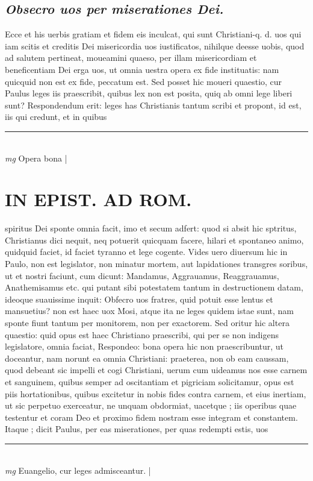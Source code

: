 \documentclass{article}
\begin{document}
\begin{pages}
\subsection*{\textit{Obsecro uos per miserationes Dei. }}\pstart Ecce et his uerbis gratiam et fidem eis inculcat, qui sunt Christiani-q. d. uos qui iam scitis et creditis Dei misericordia uos iustificatos, nihilque deesse uobis, quod ad salutem pertineat, moueamini quaeso, per illam misericordiam et beneficentiam Dei erga uos, ut omnia uestra opera ex fide instituatis: nam quicquid non est ex fide, peccatum est. Sed posset hic moueri quaestio, cur Paulus leges iis praescribit, quibus lex non est posita, quiq ab omni lege liberi sunt? Respondendum erit: leges has Christianis tantum scribi et propont, id est, iis qui credunt, et in quibus  \pend
\vspace{0.5cm}\noindent
\vspace{0.2cm}\rule{1cm}{0.2pt}\\ 
\hspace{0.2cm}\textit{mg}
\footnotesize Opera bona
\normalsize| 
\section*{IN EPIST. AD ROM.  }
\marginpar{[ p.139 ]}\pstart spiritus Dei sponte omnia facit, imo et secum adfert: quod si absit hic sptritus, Christianus dici nequit, neq potuerit quicquam facere, hilari et spontaneo animo, quidquid faciet, id faciet tyranno et lege cogente. Vides uero diuersum hic in Paulo, non est legislator, non minatur mortem, aut lapidationes transgres soribus, ut et nostri faciunt, cum dicunt: Mandamus, Aggrauamus, Reaggrauamus, Anathemisamus etc. qui putant sibi potestatem tantum in destructionem datam, ideoque suauissime inquit: Obfecro uos fratres, quid potuit esse lentus et mansuetius? non est haec uox Mosi, atque ita ne leges quidem istae sunt, nam sponte fiunt tantum per monitorem, non per exactorem. Sed oritur hic altera quaestio: quid opus est haec Christiano praescribi, qui per se non indigens legislatore, omnia faciat, Respondeo: bona opera hic non praescribuntur, ut doceantur, nam norunt ea omnia Christiani: praeterea, non ob eam caussam, quod debeant sic impelli et cogi Christiani, uerum cum uideamus nos esse carnem et sanguinem, quibus semper ad oscitantiam et pigriciam solicitamur, opus est piis hortationibus, quibus excitetur in nobis fides contra carnem, et eius inertiam, ut sic perpetuo exerceatur, ne unquam obdormiat, uacetque ; iis operibus quae testentur et coram Deo et proximo fidem nostram esse integram et constantem. Itaque ; dicit Paulus, per eas miserationes, per quas redempti estis, uos  \pend
\vspace{0.5cm}\noindent
\vspace{0.2cm}\rule{1cm}{0.2pt}\\ 
\hspace{0.2cm}\textit{mg}
\footnotesize Euangelio, cur leges admisceantur.  
\normalsize| 

\end{pages}
\end{document}
